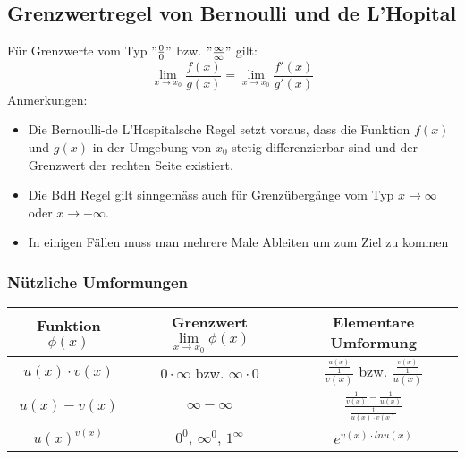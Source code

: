 \subsection{Grenzwertregel von Bernoulli und de L'Hopital}
\begin{definition}
Für Grenzwerte vom Typ $"\frac{0}{0}"$ bzw. $"\frac{\infty}{\infty}"$ gilt:
$$\lim\limits_{x \rightarrow x_0} \frac{f(x)}{g(x)} = \lim\limits_{x \rightarrow x_0} \frac{f'(x)}{g'(x)}$$
Anmerkungen:
\begin{itemize}
	\item Die Bernoulli-de L'Hospitalsche Regel setzt voraus, dass die Funktion $f(x)$ und $g(x)$ in der Umgebung von $x_0$ stetig differenzierbar sind und der Grenzwert der rechten Seite existiert.
	\item Die BdH Regel gilt sinngemäss auch für Grenzübergänge vom Typ $x \rightarrow \infty$ oder $x \rightarrow -\infty$.
	\item In einigen Fällen muss man mehrere Male Ableiten um zum Ziel zu kommen
\end{itemize}
\end{definition}

\subsubsection*{Nützliche Umformungen}
\renewcommand{\arraystretch}{3}
\begin{tabular}{|c|c|c|}
\hline 
\rule[-1ex]{0pt}{2.5ex} Funktion $\phi(x)$ & Grenzwert $\lim\limits_{x \rightarrow x_0} \phi(x)$& Elementare Umformung \\ 
\hline
\rule[-1ex]{0pt}{2.5ex} $u(x) \cdot v(x)$ & $0 \cdot \infty$ bzw. $\infty \cdot 0$ & {\Large $\frac{\frac{u(x)}{1}}{v(x)}$} bzw. {\Large $\frac{\frac{v(x)}{1}}{u(x)}$} \\ 
\hline 
\rule[-1ex]{0pt}{2.5ex} $u(x) - v(x)$ &$\infty - \infty$ & {\Large $\frac{\frac{1}{v(x)}-\frac{1}{u(x)}}{\frac{1}{u(x) \cdot v(x)}}$} \\ 
\hline 
\rule[-1ex]{0pt}{2.5ex} $u(x)^{v(x)}$ & $0^0$, $\infty^0$, $1^\infty$ & $e^{v(x) \cdot ln u(x)}$ \\ 
\hline 
\end{tabular} 